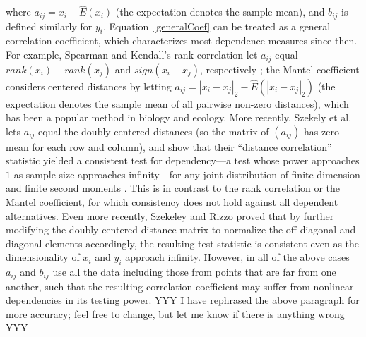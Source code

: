 \documentclass[11pt]{article}
\begin{document}
where $a_{ij}=x_i - \hat{E}(x_{i})$ (the expectation denotes the sample mean), and $b_{ij}$ is defined similarly for $y_i$.  Equation~\ref{generalCoef} can be treated as a general correlation coefficient, which characterizes most dependence measures since then.  For example, Spearman and Kendall's rank correlation let $a_{ij}$ equal $rank(x_i)-rank(x_j)$ and $sign(x_i-x_j)$, respectively \cite{KendallBook}; the Mantel coefficient \cite{Mantel1967} considers centered distances by letting $a_{ij}=|x_i-x_j|_{2}-\hat{E}(|x_i-x_j|_{2})$ (the expectation denotes the sample mean of all pairwise non-zero distances), which has been a popular method in biology and ecology. More recently, Szekely et al. \cite{SzekelyRizzoBakirov2007} lets $a_{ij}$ equal the doubly centered distances (so the matrix of $(a_{ij})$ has zero mean for each row and column), and show that their ``distance correlation'' statistic yielded a consistent test for dependency---a test whose power approaches $1$ as sample size approaches infinity---for any joint distribution of finite dimension and finite second moments \cite{SzekelyRizzo2009}. This is in contrast to the rank correlation or the Mantel coefficient, for which consistency does not hold against all dependent alternatives. 
Even more recently, Szekeley and Rizzo \cite{SzekelyRizzo2013a} proved that by further modifying the doubly centered distance matrix to normalize the off-diagonal and diagonal elements accordingly, the resulting test statistic is consistent even as the dimensionality of $x_{i}$ and $y_{i}$ approach infinity.  However, in all of the above cases $a_{ij}$ and $b_{ij}$ use all the data including those from points that are far from one another, such that the resulting correlation coefficient may suffer from nonlinear dependencies in its testing power.
YYY I have rephrased the above paragraph for more accuracy; feel free to change, but let me know if there is anything wrong YYY
\end{document}
